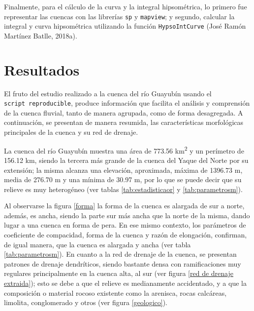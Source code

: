 \documentclass[11pt,]{article}
\begin{document}
Finalmente, para el cálculo de la curva y la integral hipsométrica, lo
primero fue representar las cuencas con las librerías \texttt{sp} y
\texttt{mapview}; y segundo, calcular la integral y curva hipsométrica
utilizando la función \texttt{HypsoIntCurve} (José Ramón Martínez
Batlle, 2018a).

\section{Resultados}\label{resultados}

El fruto del estudio realizado a la cuenca del río Guayubín usando el
\texttt{script\ reproducible}, produce información que facilita el
análisis y comprensión de la cuenca fluvial, tanto de manera agrupada,
como de forma desagregada. A continuación, se presentan de manera
resumida, las características morfológicas principales de la cuenca y su
red de drenaje.

La cuenca del río Guayubín muestra una área de 773.56
km\textsuperscript{2} y un perímetro de 156.12 km, siendo la tercera más
grande de la cuenca del Yaque del Norte por su extensión; la misma
alcanza una elevación, aproximada, máxima de 1396.73 m, media de 276.70
m y una mínima de 30.97 m, por lo que se puede decir que su relieve es
muy heterogéneo (ver tablas \ref{tab:estadisticaor} y
\ref{tab:parametrosm}).

Al observarse la figura \ref{forma} la forma de la cuenca es alargada de
sur a norte, además, es ancha, siendo la parte sur más ancha que la
norte de la misma, dando lugar a una cuenca en forma de pera. En ese
mismo contexto, los parámetros de coeficiente de compacidad, forma de la
cuenca y razón de elongación, confirman, de igual manera, que la cuenca
es alargada y ancha (ver tabla \ref{tab:parametrosm}). En cuanto a la
red de drenaje de la cuenca, se presentan patrones de drenaje
dendríticos, siendo bastante densa con ramificaciones muy regulares
principalmente en la cuenca alta, al sur (ver figura
\ref{red de drenaje extraida}); esto se debe a que el relieve es
medianamente accidentado, y a que la composición o material rocoso
existente como la arenisca, rocas calcáreas, limolita, conglomerado y
otros (ver figura \ref{geologico}).
\end{document}

